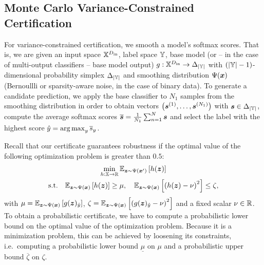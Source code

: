 \subsection{Monte Carlo Variance-Constrained Certification}\label{section:monte_carlo_variance_smoothing}
For variance-constrained certification, we smooth a model's softmax scores.
That is, we are given an input space ${\mathbb{X}}^{D_\mathrm{in}}$, label space ${\mathbb{Y}}$, base model (or -- in the case of multi-output classifiers -- base model output) $g : {\mathbb{X}}^{D_\mathrm{in}} \rightarrow \Delta_{|{\mathbb{Y}}|}$
with $\left(|{\mathbb{Y}}|-1\right)$-dimensional probability simplex $\Delta_{|{\mathbb{Y}}|} $
and smoothing distribution $\Psi({\bm{x}})$ (Bernoullli or sparsity-aware noise, in the case of binary data).
To generate a candidate prediction, we apply the base classifier to $N_1$ samples from the smoothing distribution in order to obtain vectors $\left({\bm{s}}^{(1)},\dots,{\bm{s}}^{(N_1)}\right)$ with ${\bm{s}} \in \Delta_{|{\mathbb{Y}}|}$, compute the average softmax scores $\overline{{\bm{s}}} = \frac{1}{N_1} \sum_{n=1}^{N} {\bm{s}}$ and select the label with the highest score
$\hat{y} = \operatorname*{arg\,max}_{y} \overline{{s}}_y$.

Recall that our certificate guarantees robustness if the optimal value of the following optimization problem is greater than $0.5$:
\begin{gather}\label{eq:monte_carlo_primal}
    \min_{h : {\mathbb{X}} \rightarrow {\mathbb{R}}} \mathbb{E}_{{\bm{z}} \sim \Psi({\bm{x}}')} \left[h({\bm{z}})\right]\\
    \text{s.t.} \quad
    \mathbb{E}_{{\bm{z}} \sim \Psi({\bm{x}})}\left[h({\bm{z}})\right] \geq \mu, \quad
            \mathbb{E}_{{\bm{z}} \sim \Psi({\bm{x}})}\left[\left(h({\bm{z}}) - \nu \right)^2\right] \leq \zeta,
\end{gather}
with
$\mu = \mathbb{E}_{{\bm{z}} \sim \Psi({\bm{x}})}\left[g({\bm{z}})_{\hat{y}}\right]$,
$\zeta = \mathbb{E}_{{\bm{z}} \sim \Psi({\bm{x}})}\left[\left(g({\bm{z}})_{\hat{y}} - \nu \right)^2\right]$
and a fixed scalar $\nu \in {\mathbb{R}}$.
To obtain a probabilistic certificate, we have to compute a probabilistic lower bound on the optimal value of the optimization problem. Because it is a minimization problem, this can be achieved by loosening its constraints, i.e.~computing a probabilistic lower bound $\underline{\mu}$ on $\mu$ and a probabilistic upper bound $\overline{\zeta}$ on $\zeta$.

